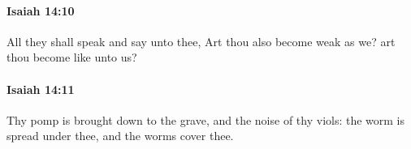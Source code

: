 		\paragraph{Isaiah 14:10} %
			\label{ISAIAH-14-10}

			All they shall speak and say unto thee, Art thou also become weak as we? art thou become like unto us?


		\paragraph{Isaiah 14:11} %
			\label{ISAIAH-14-11}

			Thy pomp is brought down to the grave, and the noise of thy viols: the worm is spread under thee, and the worms cover thee.



